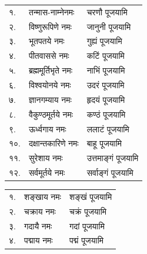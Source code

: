 \begin{center}

\begin{longtable}{ll@{— }l}
१.& तन्मास-नाम्ने\footnotemark नमः & चरणौ पूजयामि\\
२.& विष्णुरूपिणे नमः & जानुनी पूजयामि\\
३.& भूतपतये नमः & गुह्यं पूजयामि\\
४.& पीतवाससे नमः & कटिं पूजयामि\\
५.& ब्रह्ममूर्तिभृते नमः & नाभिं पूजयामि\\
६.& विश्वयोनये नमः & उदरं पूजयामि\\
७.& ज्ञानगम्याय नमः & हृदयं पूजयामि\\
८.& वैकुण्ठमूर्तये नमः & कण्ठं पूजयामि\\
९.& ऊर्ध्वगाय नमः & ललाटं पूजयामि\\
१०.& दक्षान्तकारिणे नमः & बाहू पूजयामि\\
११.& सुरेशाय नमः & उत्तमाङ्गं पूजयामि\\
१२.& सर्वमूर्तये नमः & सर्वाङ्गं पूजयामि\\
\end{longtable}


\begin{longtable}{ll@{— }l}
१.& शङ्खाय नमः & शङ्खं पूजयामि\\
२.& चक्राय नमः & चक्रं पूजयामि\\
३.& गदायै नमः & गदां पूजयामि\\
४.& पद्माय नमः & पद्मं पूजयामि\\
\end{longtable}



\end{center}
